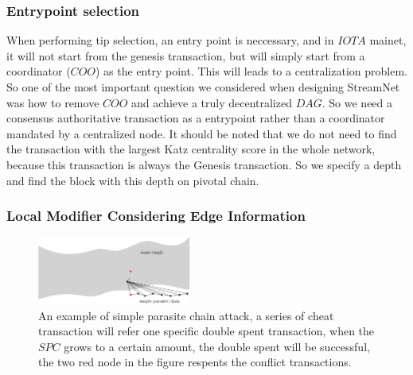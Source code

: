 

\subsubsection{Entrypoint selection}
When performing tip selection, an entry point is neccessary, and in $IOTA$ mainet, it will not start from the genesis transaction,
but will simply start from a coordinator ($COO$) as the entry point.
This will leads to a centralization problem. 
So one of the most important question we considered when designing StreamNet was how to remove $COO$ and achieve a truly decentralized $DAG$. 
So we need a consensus authoritative transaction as a entrypoint rather than a coordinator mandated by a centralized node.
It should be noted that we do not need to find the transaction with the largest Katz centrality score in the whole network,
because this transaction is always the Genesis transaction.
So we specify a depth and find the block with this depth on pivotal chain.

\subsubsection{Local Modifier Considering Edge Information}

\begin{figure}[!ht]
\begin{center}
\includegraphics[width=0.45\textwidth]{figures/spc.png}
    \caption{
        An example of simple parasite chain attack, a series of cheat transaction will refer one specific double spent transaction, 
        when the $SPC$ grows to a certain amount, the double spent will be successful, the two red node in the figure respents the 
        conflict transactions.
     }
\label{spc}
\end{center}
\end{figure}


